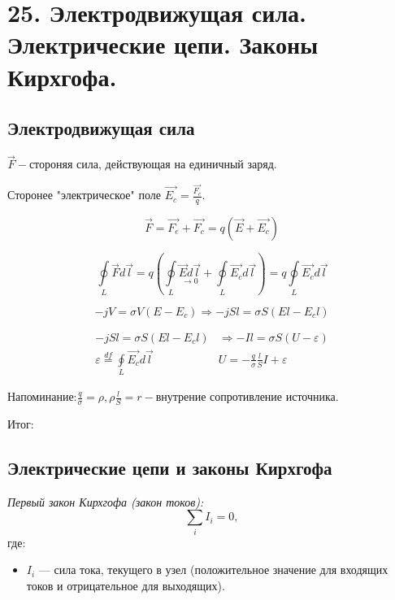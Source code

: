 \section*{25. Электродвижущая сила. Электрические цепи. Законы Кирхгофа.}
 
\subsection*{Электродвижущая сила}


$\vec{F}-$стороняя сила, действующая на единичный заряд.

Сторонее "электрическое" поле $\vec{E_c}= \frac{\vec{F_c}}{q}.$

\[\vec{F}=\vec{F_e}+\vec{F_c}=q(\vec{E}+\vec{E_c})\]

\[\underset{L}{\oint}\vec{F}d\vec{l}=q\left( \underset{L}{\oint} \underset{\rightarrow 0}{\vec{E}d\vec{l}} + \underset{L}{\oint} \vec{E_c}d\vec{l} \right)=q\underset{L}{\oint} \vec{E_c}d\vec{l}\]

\[-jV=\sigma V(E-E_c)\Rightarrow-jSl=\sigma S(El-E_cl)\]

\[
\begin{array}{l|l}
    -jSl=\sigma S(El-E_cl) & \Rightarrow -Il=\sigma S(U-\varepsilon)\\
    \varepsilon\overset{df}{=}\underset{L}{\oint} \vec{E_c}d\vec{l} & U=-\frac{q}{\sigma}\frac{l}{S}I+\varepsilon     
\end{array}
\]

Напоминание:$\frac{q}{\sigma}=\rho, \rho\frac{l}{S}=r-$внутрение сопротивление источника.

\begin{center}
    Итог:
\end{center}

\newpage

\subsection*{Электрические цепи и законы Кирхгофа}

\textit{Первый закон Кирхгофа (закон токов):}
\[
\sum_{i} I_i = 0,
\]
где:  
\begin{itemize}
    \item \( I_i \) — сила тока, текущего в узел (положительное значение для входящих токов и отрицательное для выходящих).
\end{itemize}

